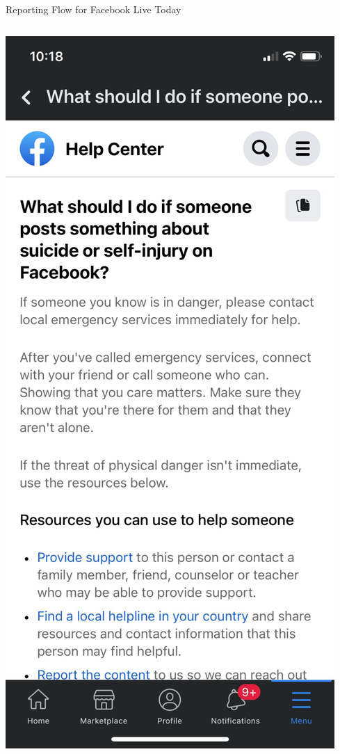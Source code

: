 \documentclass[nobackground,dvipsnames,table,aspectratio=169]{beamer}
\begin{document}
\begin{frame}{Reporting Flow for Facebook Live Today}
\begin{columns}
            \includegraphics[width=\textwidth]{facebook-live-current-reporting-flow-4}
    \end{columns}
\end{frame}
\end{document}
